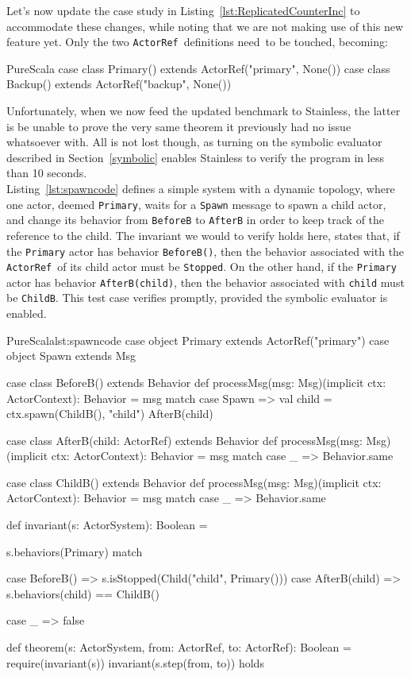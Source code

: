 \documentclass[a4paper,twoside]{article}
\newcommand{\InlineS}[1]{\lstinline[language=PureScala,basicstyle=\small\ttfamily,columns=fixed]|#1|}
\newcommand{\RefSec}[1]{Section~\ref{#1}}
\newcommand{\RefCode}[1]{Listing~\ref{#1}}
\newcommand{\ActorRef}{\InlineS{ActorRef}\ }
\newcommand{\stt}[1]{\texttt{\small{#1}}}
\begin{document}
Let's now update the case study in \RefCode{lst:ReplicatedCounterInc} to accommodate 
these changes, while noting that we are not making use of this new feature yet. Only 
the two \ActorRef definitions need to be touched, becoming:

\begin{ShortCode}{PureScala}
case class Primary() extends ActorRef("primary", None())
case class Backup()  extends ActorRef("backup", None())
\end{ShortCode}

Unfortunately, when we now feed the updated benchmark to Stainless, the latter is be 
unable to prove the very same theorem it previously had no issue whatsoever with.
All is not lost though, as turning on the symbolic evaluator described in
\RefSec{symbolic} enables Stainless to verify the program in less than 10 seconds.\\

\RefCode{lst:spawncode} defines a simple system with a dynamic topology, where one actor, deemed \stt{Primary}, waits for a \stt{Spawn} message to spawn a child actor, and change its behavior from \stt{BeforeB} to \stt{AfterB} in order to keep track of the reference to the child. The invariant we would to verify holds here, states that, if the \stt{Primary} actor has behavior \stt{BeforeB()}, then the behavior associated with the \ActorRef of its child actor must be \stt{Stopped}. On the other hand, if the \stt{Primary} actor has behavior \stt{AfterB(child)}, then the behavior associated with \stt{child} must be \stt{ChildB}. This test case verifies promptly, provided the symbolic evaluator is enabled.

\begin{Code}{PureScala}{lst:spawncode}{}
case object Primary extends ActorRef("primary")
case object Spawn extends Msg

case class BeforeB() extends Behavior {
  def processMsg(msg: Msg)(implicit ctx: ActorContext): Behavior = msg match {
    case Spawn =>
      val child = ctx.spawn(ChildB(), "child")
      AfterB(child)
  }
}

case class AfterB(child: ActorRef) extends Behavior {
  def processMsg(msg: Msg)(implicit ctx: ActorContext): Behavior = msg match {
    case _ => Behavior.same
  }
}

case class ChildB() extends Behavior {
  def processMsg(msg: Msg)(implicit ctx: ActorContext): Behavior = msg match {
    case _ => Behavior.same
  }
}

def invariant(s: ActorSystem): Boolean = {
  s.behaviors(Primary) match {
    case BeforeB() =>
      s.isStopped(Child("child", Primary()))
    case AfterB(child) =>
      s.behaviors(child) == ChildB()

    case _ => false
  }
}

def theorem(s: ActorSystem, from: ActorRef, to: ActorRef): Boolean = {
  require(invariant(s))
  invariant(s.step(from, to))
} holds
\end{Code}
\end{document}
